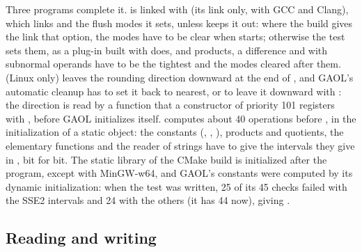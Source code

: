 \medskip
Three programs complete it.  is linked with
 (its link only, with GCC and Clang), which links
 and the flush modes it sets, unless
 keeps it out: where the build gives the link that
option, the modes have to be clear when  starts; otherwise the
test sets them, as a plug-in built with  does, and products,
a difference and  with subnormal operands have to be the tightest
and the modes cleared after them.\newinvfive{} 
(Linux only) leaves the rounding direction downward at the end of
, and GAOL's automatic cleanup has to set it back to nearest,
or to leave it downward with : the
direction is read by a function that a constructor of priority 101 registers
with , before GAOL initializes itself.
 computes about 40 operations before
, in the initialization of a static object: the constants
(, , ), products and quotients, the
elementary functions and the reader of strings have to give the intervals
they give in , bit for bit. The static library of the CMake
build is initialized after the program, except with MinGW-w64, and GAOL's
constants were computed by its dynamic initialization: when the test was
written, 25 of its 45 checks failed with the SSE2 intervals and 24 with the
others (it has 44 now),  giving \code{[-0, 0]}.\newinvfive

\subsection{Reading and writing}


